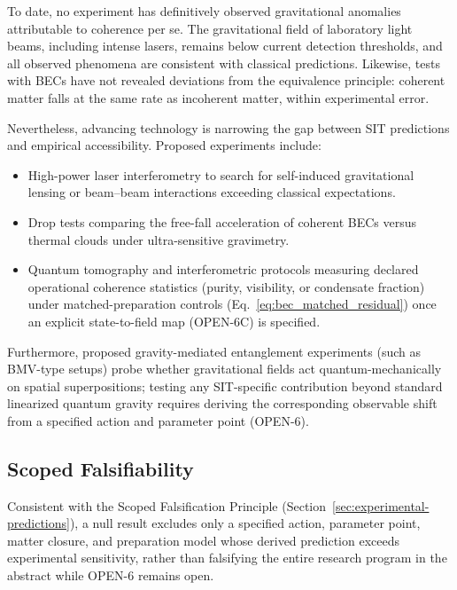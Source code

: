 \documentclass[american,11pt,letterpaper]{article}
\def\texttt#1{#1}%
\begin{document}
To date, no experiment has definitively observed gravitational anomalies attributable to coherence per se. The gravitational field of laboratory light beams, including intense lasers, remains below current detection thresholds, and all observed phenomena are consistent with classical predictions. Likewise, tests with BECs have not revealed deviations from the equivalence principle: coherent matter falls at the same rate as incoherent matter, within experimental error.

Nevertheless, advancing technology is narrowing the gap between SIT predictions and empirical accessibility. Proposed experiments include:
\begin{itemize}
    \item High-power laser interferometry to search for self-induced gravitational lensing or beam--beam interactions exceeding classical expectations.
    \item Drop tests comparing the free-fall acceleration of coherent BECs versus thermal clouds under ultra-sensitive gravimetry.
    \item Quantum tomography and interferometric protocols measuring declared operational coherence statistics (purity, visibility, or condensate fraction) under matched-preparation controls (Eq.~\eqref{eq:bec_matched_residual}) once an explicit state-to-field map (\texttt{OPEN-6C}) is specified.
\end{itemize}

Furthermore, proposed gravity-mediated entanglement experiments (such as BMV-type setups) probe whether gravitational fields act quantum-mechanically on spatial superpositions; testing any SIT-specific contribution beyond standard linearized quantum gravity requires deriving the corresponding observable shift from a specified action and parameter point (\texttt{OPEN-6}).

\subsection{Scoped Falsifiability}

Consistent with the Scoped Falsification Principle (Section~\ref{sec:experimental-predictions}), a null result excludes only a specified action, parameter point, matter closure, and preparation model whose derived prediction exceeds experimental sensitivity, rather than falsifying the entire research program in the abstract while \texttt{OPEN-6} remains open.
\end{document}
